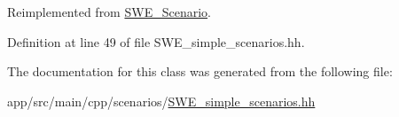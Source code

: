 Reimplemented from \hyperlink{classSWE__Scenario_ade6f356d60b1402c034611266462b88b}{S\+W\+E\+\_\+\+Scenario}.



Definition at line 49 of file S\+W\+E\+\_\+simple\+\_\+scenarios.\+hh.



The documentation for this class was generated from the following file\+:\begin{DoxyCompactItemize}
\item 
app/src/main/cpp/scenarios/\hyperlink{SWE__simple__scenarios_8hh}{S\+W\+E\+\_\+simple\+\_\+scenarios.\+hh}\end{DoxyCompactItemize}
